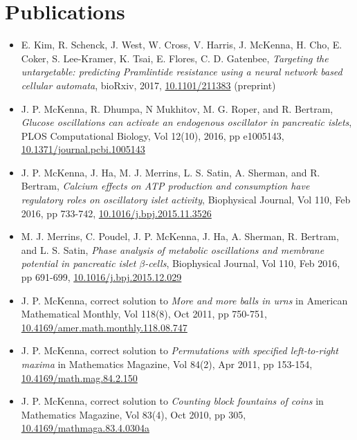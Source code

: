 \documentclass[11pt]{cv}
\begin{document}
\section*{Publications}
\label{sec:orgd2ada5f}
\begin{itemize}
\item E. Kim, R. Schenck, J. West, W. Cross, V. Harris, J. McKenna, H. Cho, E. Coker, S. Lee-Kramer, K. Tsai, E. Flores, C. D. Gatenbee, \emph{Targeting the untargetable: predicting Pramlintide resistance using a neural network based cellular automata}, bioRxiv, 2017, \href{http://dx.doi.org/10.1101/211383}{10.1101/211383} (preprint)\\
\item J. P. McKenna, R. Dhumpa, N Mukhitov, M. G. Roper, and R. Bertram, \emph{Glucose oscillations can activate an endogenous oscillator in pancreatic islets}, PLOS Computational Biology, Vol 12(10), 2016, pp e1005143, \href{http://dx.doi.org/10.1371/journal.pcbi.1005143}{10.1371/journal.pcbi.1005143}\\
\item J. P. McKenna, J. Ha, M. J. Merrins, L. S. Satin, A. Sherman, and R. Bertram, \emph{Calcium effects on ATP production and consumption have regulatory roles on oscillatory islet activity}, Biophysical Journal, Vol 110, Feb 2016, pp 733-742, \href{http://dx.doi.org/10.1016/j.bpj.2015.11.3526}{10.1016/j.bpj.2015.11.3526}\\
\item M. J. Merrins, C. Poudel, J. P. McKenna, J. Ha, A. Sherman, R. Bertram, and L. S. Satin, \emph{Phase analysis of metabolic oscillations and membrane potential in pancreatic islet \(\beta\)-cells}, Biophysical Journal, Vol 110, Feb 2016, pp 691-699, \href{http://dx.doi.org/10.1016/j.bpj.2015.12.029}{10.1016/j.bpj.2015.12.029}\\
\item J. P. McKenna, correct solution to \emph{More and more balls in urns} in American Mathematical Monthly, Vol 118(8), Oct 2011, pp 750-751, \href{http://dx.doi.org/10.4169/amer.math.monthly.118.08.747}{10.4169/amer.math.monthly.118.08.747}\\
\item J. P. McKenna, correct solution to \emph{Permutations with specified left-to-right maxima} in Mathematics Magazine, Vol 84(2), Apr 2011, pp 153-154, \href{http://dx.doi.org/10.4169/math.mag.84.2.150}{10.4169/math.mag.84.2.150}\\
\item J. P. McKenna, correct solution to \emph{Counting block fountains of coins} in Mathematics Magazine, Vol 83(4), Oct 2010, pp 305, \href{http://www.jstor.org/stable/10.4169/mathmaga.83.4.0304a}{10.4169/mathmaga.83.4.0304a}\\
\end{itemize}
\end{document}
